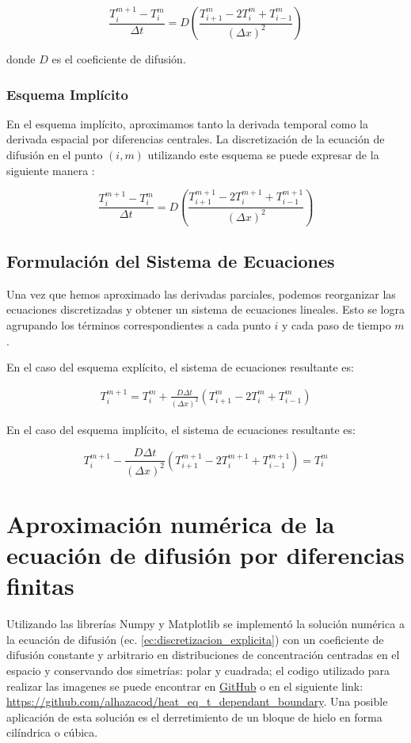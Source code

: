 \documentclass{article}
\begin{document}
\[
\frac{T_i^{m+1} - T_i^m}{\Delta t} = D \left( \frac{T_{i+1}^m - 2T_i^m + T_{i-1}^m}{(\Delta x)^2} \right)
\]

donde \(D\) es el coeficiente de difusión.


\subsubsection{Esquema Implícito}
En el esquema implícito, aproximamos tanto la derivada temporal como la derivada espacial por diferencias centrales. La discretización de la ecuación de difusión en el punto \((i,m)\) utilizando este esquema se puede expresar de la siguiente manera \cite{difusion_diferencias_finitas}:

\[
\frac{T_i^{m+1} - T_i^m}{\Delta t} = D \left( \frac{T_{i+1}^{m+1} - 2T_i^{m+1} + T_{i-1}^{m+1}}{(\Delta x)^2} \right)
\]

\subsection{Formulación del Sistema de Ecuaciones}

Una vez que hemos aproximado las derivadas parciales, podemos reorganizar las ecuaciones discretizadas y obtener un sistema de ecuaciones lineales. Esto se logra agrupando los términos correspondientes a cada punto \(i\) y cada paso de tiempo \(m\).

En el caso del esquema explícito, el sistema de ecuaciones resultante es:

\begin{gather}
T_i^{m+1} = T_i^m + \frac{D \Delta t}{(\Delta x)^2} (T_{i+1}^m - 2T_i^m + T_{i-1}^m)
\label{ec:discretizacion_explicita}
\end{gather}

En el caso del esquema implícito, el sistema de ecuaciones resultante es:

\[
T_i^{m+1} - \frac{D \Delta t}{(\Delta x)^2} (T_{i+1}^{m+1} - 2T_i^{m+1} + T_{i-1}^{m+1}) = T_i^m
\]

\section{Aproximación numérica de la ecuación de difusión por diferencias finitas}
Utilizando las librerías Numpy y Matplotlib se implementó la solución numérica a la ecuación de difusión (ec. \ref{ec:discretizacion_explicita}) con un coeficiente de difusión constante y arbitrario en distribuciones de concentración centradas en el espacio y conservando dos simetrías: polar y cuadrada; el codigo utilizado para realizar las imagenes se puede encontrar en \href{https://github.com/alhazacod/heat_eq_t_dependant_boundary}{GitHub} o en el siguiente link: \url{https://github.com/alhazacod/heat_eq_t_dependant_boundary}. Una posible aplicación de esta solución es el derretimiento de un bloque de hielo en forma cilíndrica o cúbica.
\end{document}
